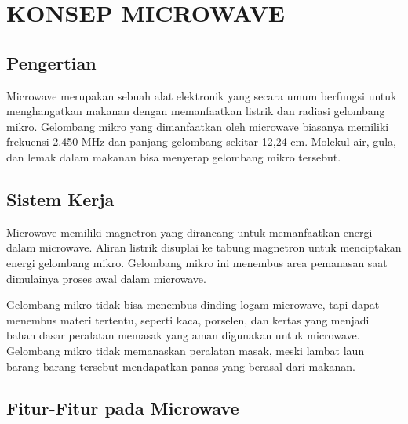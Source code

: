 \documentclass[conference]{IEEEtran}
\begin{document}
\section{KONSEP MICROWAVE}

\subsection{Pengertian}
Microwave merupakan sebuah alat elektronik yang secara umum berfungsi untuk 
menghangatkan makanan dengan memanfaatkan listrik dan radiasi gelombang mikro. 
Gelombang mikro yang dimanfaatkan oleh microwave biasanya memiliki frekuensi 2.450 MHz 
dan panjang gelombang sekitar 12,24 cm. Molekul air, gula, dan lemak dalam makanan bisa 
menyerap gelombang mikro tersebut. 

\subsection{Sistem Kerja}
Microwave memiliki magnetron yang dirancang untuk memanfaatkan energi dalam microwave. 
Aliran listrik disuplai ke tabung magnetron untuk menciptakan energi gelombang mikro. Gelombang mikro ini 
menembus area pemanasan saat dimulainya proses awal dalam microwave.

Gelombang mikro tidak bisa menembus dinding logam microwave, tapi dapat menembus materi tertentu, seperti kaca, 
porselen, dan kertas yang menjadi bahan dasar peralatan memasak yang aman digunakan untuk microwave. 
Gelombang mikro tidak memanaskan peralatan masak, meski lambat laun barang-barang tersebut mendapatkan panas yang 
berasal dari makanan.

\subsection{Fitur-Fitur pada Microwave}
\end{document}
